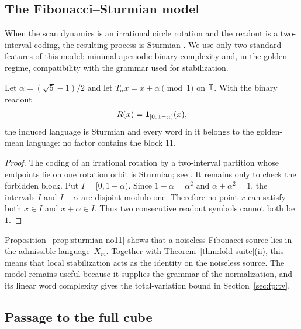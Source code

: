\subsection{The Fibonacci--Sturmian model}\label{sec:readout:sturmian}

When the scan dynamics is an irrational circle rotation and the readout is a two-interval coding, the resulting process is Sturmian \cite{MorseHedlund1940,Lothaire2002,Queffelec2010}. We use only two standard features of this model: minimal aperiodic binary complexity and, in the golden regime, compatibility with the grammar used for stabilization.

\begin{proposition}\label{prop:sturmian-no11}
Let $\alpha=(\sqrt5-1)/2$ and let $T_\alpha x=x+\alpha\pmod 1$ on $\mathbb{T}$.
With the binary readout
\[
R(x)=\mathbf{1}_{[0,\,1-\alpha)}(x),
\]
the induced language is Sturmian and every word in it belongs to the
golden-mean language: no factor contains the block $11$.
\end{proposition}

\begin{proof}
The coding of an irrational rotation by a two-interval partition whose
endpoints lie on one rotation orbit is Sturmian; see
\cite{MorseHedlund1940,Lothaire2002,Queffelec2010}.  It remains only to check
the forbidden block.  Put $I=[0,1-\alpha)$.  Since $1-\alpha=\alpha^2$ and
$\alpha+\alpha^2=1$, the intervals $I$ and $I-\alpha$ are disjoint modulo
one.  Therefore no point $x$ can satisfy both $x\in I$ and
$x+\alpha\in I$.  Thus two consecutive readout symbols cannot both be $1$.
\end{proof}

\begin{remark}
Proposition~\ref{prop:sturmian-no11} shows that a noiseless Fibonacci source lies in the admissible language~$X_m$. Together with Theorem~\ref{thm:fold-suite}(ii), this means that local stabilization acts as the identity on the noiseless source. The model remains useful because it supplies the grammar of the normalization, and its linear word complexity gives the total-variation bound in Section~\ref{sec:fp:tv}.
\end{remark}

\subsection{Passage to the full cube}\label{sec:readout:noise}

